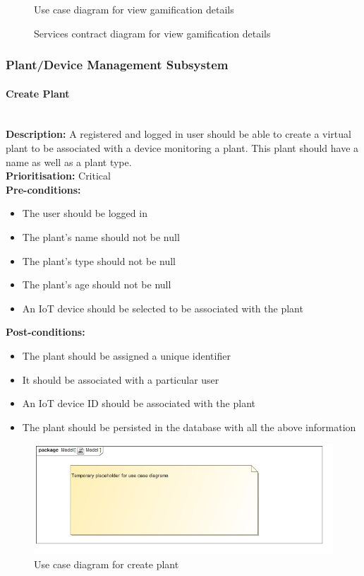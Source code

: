 \documentclass{article}
\begin{document}
		\begin{figure}[H]
			\caption{Use case diagram for view gamification details}
		\end{figure}
		
		\begin{figure}[H]
			\caption{Services contract diagram for view gamification details}
		\end{figure}

\subsubsection{Plant/Device Management Subsystem}
	\paragraph{Create Plant}\mbox{}\\
		\textbf{Description:} A registered and logged in user should be able to create a virtual plant to be associated with a device monitoring a plant. This plant should have a name as well as a plant type.\\
		\textbf{Prioritisation:} Critical\\		
		\textbf{Pre-conditions:}
			\begin{itemize}
				\item The user should be logged in
				\item The plant's name should not be null
				\item The plant's type should not be null
				\item The plant's age should not be null
				\item An IoT device should be selected to be associated with the plant
			\end{itemize}
		\textbf{Post-conditions:}
			\begin{itemize}
				\item The plant should be assigned a unique identifier
				\item It should be associated with a particular user
				\item An IoT device ID should be associated with the plant
				\item The plant should be persisted in the database with all the above information
			\end{itemize}

		\begin{figure}[H]
			\includegraphics[width=\linewidth]{images/tempUseCase.jpg}
			\caption{Use case diagram for create plant}
		\end{figure}
		
\end{document}
